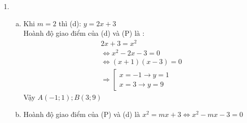 \begin{enumerate}[1.]
:
$\left\{ {\begin{array}{*{20}{c}}
  a {\displaystyle = \frac{1}{{x + y}}} \\ 
  b {\displaystyle = \frac{1}{{y - 2}}} 
\end{array}} \right.\text{\;với\;}(y \ne 2;x \ne  - 2)$\\
Hệ ban đầu tương đương với :\\
$\begin{gathered}
  \left\{ {\begin{array}{*{20}{c}}
  {4a + b = 2} \\ 
  {2a - 3b =  - \frac{5}{2}} 
\end{array}} \right. \Leftrightarrow \left\{ {\begin{array}{*{20}{c}}
  {a = \frac{1}{4}} \\ 
  {b = 1} 
\end{array}} \right. \hfill \\
   \Rightarrow \left\{ {\begin{array}{*{20}{c}}
  {\displaystyle\frac{1}{{x + y}} = \frac{1}{4}} \\ 
  {\displaystyle\frac{1}{{y - 2}} = 1} 
\end{array}} \right. \Rightarrow \left\{ {\begin{array}{*{20}{c}}
  {x = 1} \\ 
  {y = 3} 
\end{array}} \right.(TM) \hfill \\ 
\end{gathered}$
 \item 
\begin{enumerate}[a.]
\item Khi $m = 2$  thì (d): $y = 2x + 3$\\
Hoành độ giao điểm của (d) và (P) là :
\begin{align*}
  &2x + 3 = {x^2} \\
   &\Leftrightarrow {x^2} - 2x - 3 = 0  \\
   &\Leftrightarrow \left( {x + 1} \right)\left( {x - 3} \right) = 0  \\
   &\Rightarrow \left[ {\begin{array}{*{20}{c}}
  {x =  - 1 \to y = 1} \\ 
  {x = 3 \to y = 9} 
\end{array}} \right. 
\end{align*} 
Vậy $A(-1;1); B(3;9)$
\item Hoành độ giao điểm của (P) và (d) là $x^{2} = mx + 3 \Leftrightarrow x^{2} - mx - 3 = 0$\\

\end{enumerate}
\end{enumerate}
